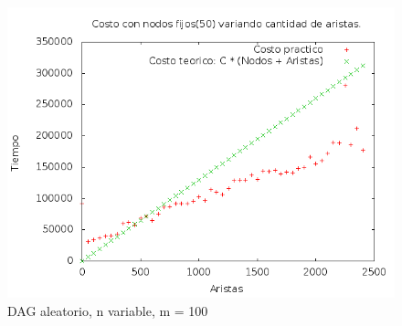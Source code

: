 
%

%
%




\begin{figure}[H]
	\centering
	\includegraphics[scale=0.5]{blank.png}
	\caption{DAG aleatorio,  n variable, m = 100}
\end{figure}

